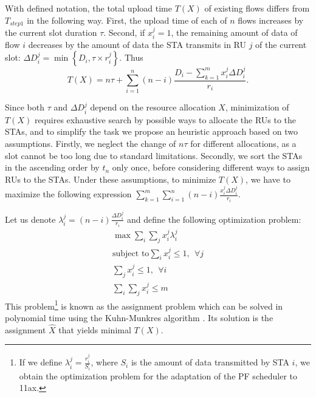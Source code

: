 With defined notation, the total upload time $T\left(X\right) $ of existing flows differs from $T_{step1}$ in the following way. First, the upload time of each of $n$ flows increases by  the current slot duration $\tau$. Second, if $x_i^j=1$, the remaining amount of data of flow $i$ decreases by the amount of data the STA transmits in RU $j$ of the current slot: $\Delta D_i^j = \min\left\{D_i, \tau \times r_{i}^{j}\right\}$. Thus  
\begin{equation}
T\left(X\right) = n \tau + \sum_{i = 1}^{n} \left(n - i\right) \frac{D_i -  \sum_{k = 1}^{m} x_i^j \Delta D_i^j}{r_{i}}.
\end{equation}



Since both $\tau$ and  $\Delta D_i^j$ depend on the resource allocation $X$, minimization of $T(X)$ requires exhaustive search by possible ways to allocate the RUs to the STAs, and to simplify the task we propose an heuristic approach based on two assumptions.
Firstly, we neglect the change of $n \tau$ for different allocations, as a slot cannot be too long due to standard limitations.
Secondly, we sort the STAs in the ascending order by $t_n$ only once, before considering different ways to assign RUs to the STAs.
Under these assumptions, to minimize  $T(X)$, we have to maximize the following expression $\sum_{k = 1}^{m} \sum_{i = 1}^{n } \left(n - i\right) \frac{x_i^j \Delta D_i^j}{r_{i}}$.

Let us denote $\lambda_i^j = \left(n - i\right) \frac{\Delta D_i^j}{r_{i}}$ and define the following optimization problem:
\begin{align}
\max \sum_{i} \sum_{j} x_i^j \lambda_i^j \\
\text{subject to} \sum_{i} x_i^j \leq 1,\ \  \forall j \\
\sum_{j} x_i^j \leq 1, \ \ \forall i \\
\sum_{i} \sum_{j} x_i^j \leq m
\end{align}
This problem\footnote{If we define $\lambda_i^j = \frac{r_i^j}{S_i}$, where $S_i$ is the amount of data transmitted by STA $i$, we obtain the optimization problem for the adaptation of the PF scheduler to 11ax.} is known as the assignment problem which can be solved in polynomial time using the Kuhn-Munkres algorithm \cite{bourgeois1971extension}.
Its solution is the assignment $\hat X$ that yields minimal $T(X)$.

